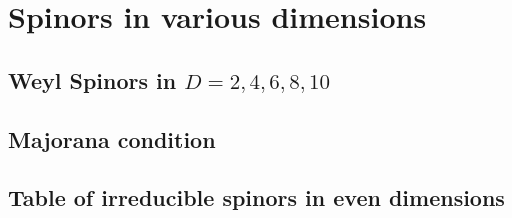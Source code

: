 
\chapter{Spinors in various dimensions}
\label{ap:spinors}
\section{Weyl Spinors in $D = 2,4,6,8,10$}

\section{Majorana condition}

\section{Table of irreducible spinors in even dimensions}
